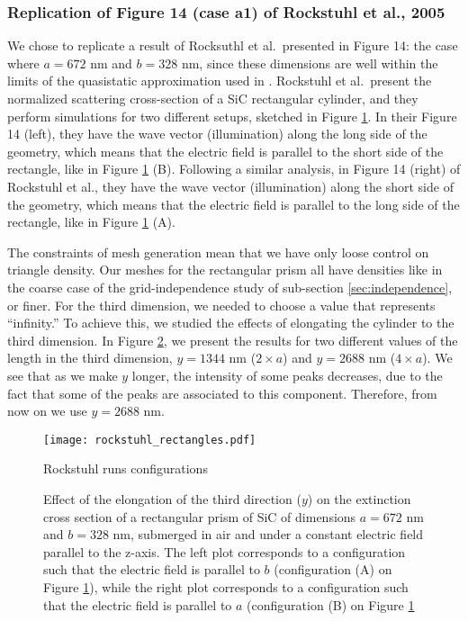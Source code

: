\subsubsection{Replication of Figure 14 (case a1) of Rockstuhl et al., 2005}

We chose to replicate a result of Rocksuthl et al.\ presented in Figure 14: 
the case where $a=672$ nm 
and $b=328$ nm, since these dimensions are well within the limits of the quasistatic approximation 
used in \pygbe. Rockstuhl et al.\ present the normalized scattering cross-section of a SiC rectangular 
cylinder, and they perform simulations for two different setups, sketched in Figure \ref{fig:rectangle_sketch}. In 
their Figure 14 (left), they have the wave vector (illumination) along the long 
side of the geometry, which means that the electric field is parallel to the short side of the rectangle, like in 
Figure \ref{fig:rectangle_sketch} (B). Following a similar analysis, in Figure 14 (right) of Rockstuhl et al., they have the wave 
vector (illumination) along the short side of the geometry, which means that the electric field is parallel to the 
long side of the rectangle, like in Figure \ref{fig:rectangle_sketch} (A). 

The constraints of mesh generation mean that we have only loose control on triangle density. Our meshes for the rectangular prism all have densities like in the coarse case of the grid-independence study of sub-section \ref{sec:independence}, or finer.
For the third dimension, we needed to choose a value that represents ``infinity.'' To achieve this, we studied the effects of 
elongating the cylinder to the third dimension. In Figure \ref{fig:ext_y_14}, we present the results for two different
values of the length in the third dimension, $y=1344$ nm ($2\times a$) and $y=2688$ nm ($4\times a$). We see that as we make $y$ longer, the 
intensity of some peaks decreases, due to the fact that some of the peaks are associated to this component. Therefore, 
from now on we use $y=2688$ nm. 

\begin{figure}
    \centering
    \texttt{[image: rockstuhl\_rectangles.pdf]} 
    \caption{Rockstuhl runs configurations}
    \label{fig:rectangle_sketch}
\end{figure}

\begin{figure}
    \centering
    \caption{Effect of the elongation of the third direction ($y$) on the 
        extinction cross section of a rectangular prism of SiC of dimensions $a=672$ nm 
        and $b=328$ nm, submerged in air and under a constant electric field 
        parallel to the z-axis. The left plot corresponds to a configuration such that the electric 
        field is parallel to $b$ (configuration (A) on Figure \ref{fig:rectangle_sketch}), while the 
        right plot corresponds to a configuration such that the electric field is 
        parallel to $a$ (configuration (B) on Figure \ref{fig:rectangle_sketch}}
    \label{fig:ext_y_14}   
 \end{figure}


